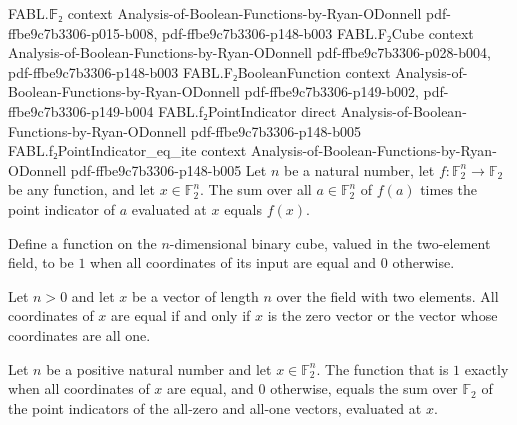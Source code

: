 \begin{theorem}
\leanok
{}
\proofstep
  {FABL.𝔽₂}
  {context}
  {Analysis-of-Boolean-Functions-by-Ryan-ODonnell}
  {pdf-ffbe9c7b3306-p015-b008,
    pdf-ffbe9c7b3306-p148-b003}
\proofstep
  {FABL.F₂Cube}
  {context}
  {Analysis-of-Boolean-Functions-by-Ryan-ODonnell}
  {pdf-ffbe9c7b3306-p028-b004,
    pdf-ffbe9c7b3306-p148-b003}
\proofstep
  {FABL.F₂BooleanFunction}
  {context}
  {Analysis-of-Boolean-Functions-by-Ryan-ODonnell}
  {pdf-ffbe9c7b3306-p149-b002,
    pdf-ffbe9c7b3306-p149-b004}
\proofstep
  {FABL.f₂PointIndicator}
  {direct}
  {Analysis-of-Boolean-Functions-by-Ryan-ODonnell}
  {pdf-ffbe9c7b3306-p148-b005}
\proofstep
  {FABL.f₂PointIndicator_eq_ite}
  {context}
  {Analysis-of-Boolean-Functions-by-Ryan-ODonnell}
  {pdf-ffbe9c7b3306-p148-b005}
Let $n$ be a natural number, let $f:\mathbb F_2^n\to\mathbb F_2$ be any function, and
let $x\in\mathbb F_2^n$. The sum over all $a\in\mathbb F_2^n$ of $f(a)$ times the point
indicator of $a$ evaluated at $x$ equals $f(x)$.
\end{theorem}

\begin{definition}
\leanok
{}
Define a function on the $n$-dimensional binary cube, valued in the two-element field,
to be $1$ when all coordinates of its input are equal and $0$ otherwise.
\end{definition}

\begin{theorem}
\label{FABL.forall_coordinate_eq_iff_eq_zero_or_eq_one}
\leanok
{}
Let $n>0$ and let $x$ be a vector of length $n$ over the field with two elements. All
coordinates of $x$ are equal if and only if $x$ is the zero vector or the vector whose
coordinates are all one.
\end{theorem}

\begin{theorem}
\leanok
{}
Let $n$ be a positive natural number and let $x\in\mathbb F_2^n$. The function that is
$1$ exactly when all coordinates of $x$ are equal, and $0$ otherwise, equals the sum
over $\mathbb F_2$ of the point indicators of the all-zero and all-one vectors,
evaluated at $x$.
\end{theorem}

